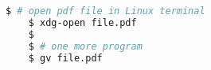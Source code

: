 \begin{lstlisting}[language=bash]
    $ # open pdf file in Linux terminal
    $ xdg-open file.pdf
    $
    $ # one more program
    $ gv file.pdf

\end{lstlisting}